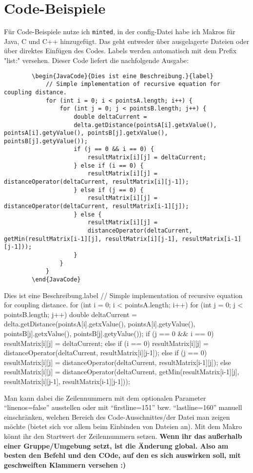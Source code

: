 \section{Code-Beispiele}
Für Code-Beispiele nutze ich \texttt{minted}, in der config-Datei habe ich Makros für Java, C und C++ hinzugefügt. Das geht entweder über ausgelagerte Dateien oder über direktes Einfügen des Codes.  Labels werden automatisch mit dem Prefix "list:" versehen. 
Dieser Code liefert die nachfolgende Ausgabe:
	\begin{verbatim}
		\begin{JavaCode}{Dies ist eine Beschreibung.}{label}
			// Simple implementation of recursive equation for coupling distance.
			for (int i = 0; i < pointsA.length; i++) {
				for (int j = 0; j < pointsB.length; j++) {
					double deltaCurrent =
					delta.getDistance(pointsA[i].getxValue(), pointsA[i].getyValue(), pointsB[j].getxValue(), pointsB[j].getyValue());
					if (j == 0 && i == 0) {
						resultMatrix[i][j] = deltaCurrent;
					} else if (i == 0) {
						resultMatrix[i][j] = distanceOperator(deltaCurrent, resultMatrix[i][j-1]);
					} else if (j == 0) {
						resultMatrix[i][j] = distanceOperator(deltaCurrent, resultMatrix[i-1][j]);
					} else {
						resultMatrix[i][j] =
						distanceOperator(deltaCurrent, getMin(resultMatrix[i-1][j], resultMatrix[i][j-1], resultMatrix[i-1][j-1]));
					}
				}
			}
		\end{JavaCode}
	\end{verbatim}
{
	\begin{JavaCode}{Dies ist eine Beschreibung.}{label}
		// Simple implementation of recursive equation for coupling distance.
		for (int i = 0; i < pointsA.length; i++) {
			for (int j = 0; j < pointsB.length; j++) {
				double deltaCurrent =
				delta.getDistance(pointsA[i].getxValue(), pointsA[i].getyValue(), pointsB[j].getxValue(), pointsB[j].getyValue());
				if (j == 0 && i == 0) {
					resultMatrix[i][j] = deltaCurrent;
				} else if (i == 0) {
					resultMatrix[i][j] = distanceOperator(deltaCurrent, resultMatrix[i][j-1]);
				} else if (j == 0) {
					resultMatrix[i][j] = distanceOperator(deltaCurrent, resultMatrix[i-1][j]);
				} else {
					resultMatrix[i][j] =
					distanceOperator(deltaCurrent, getMin(resultMatrix[i-1][j], resultMatrix[i][j-1], resultMatrix[i-1][j-1]));
				}
			}
		}
	\end{JavaCode}
	Man kann dabei die Zeilennummern mit dem optionalen Parameter \enquote{linenos=false} ausstellen oder mit \enquote{firstline=151} bzw. \enquote{lastline=160} manuell einschränken, welchen Bereich des Code-Ausschnittes/der Datei man zeigen möchte (bietet sich vor allem beim Einbinden von Dateien an). Mit dem Makro \texttt{} könnt ihr den Startwert der Zeilennummern setzen. \textbf{Wenn ihr das außerhalb einer Gruppe/Umgebung setzt, ist die Änderung global. Also am besten den Befehl und den COde, auf den es sich auswirken soll, mit geschweiften Klammern versehen :)}}
	
